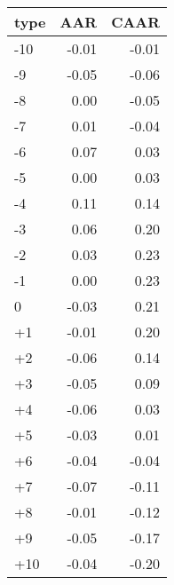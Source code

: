\begin{tabular}{lrr}
  \hline
type & AAR & CAAR \\ 
  \hline
-10 & -0.01 & -0.01 \\ 
  -9 & -0.05 & -0.06 \\ 
  -8 & 0.00 & -0.05 \\ 
  -7 & 0.01 & -0.04 \\ 
  -6 & 0.07 & 0.03 \\ 
  -5 & 0.00 & 0.03 \\ 
  -4 & 0.11 & 0.14 \\ 
  -3 & 0.06 & 0.20 \\ 
  -2 & 0.03 & 0.23 \\ 
  -1 & 0.00 & 0.23 \\ 
  0 & -0.03 & 0.21 \\ 
  +1 & -0.01 & 0.20 \\ 
  +2 & -0.06 & 0.14 \\ 
  +3 & -0.05 & 0.09 \\ 
  +4 & -0.06 & 0.03 \\ 
  +5 & -0.03 & 0.01 \\ 
  +6 & -0.04 & -0.04 \\ 
  +7 & -0.07 & -0.11 \\ 
  +8 & -0.01 & -0.12 \\ 
  +9 & -0.05 & -0.17 \\ 
  +10 & -0.04 & -0.20 \\ 
   \hline
\end{tabular}

